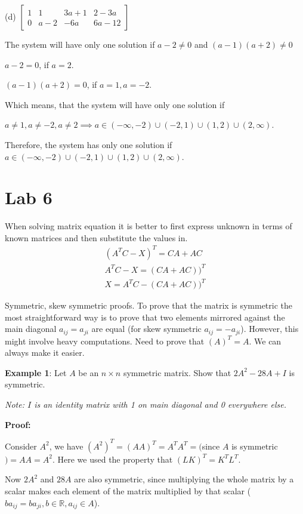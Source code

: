 \documentclass{article}
\begin{document}
\begin{enumerate}
(d) $\left[\begin{array}{ccc|c}1 & 1 & 3 a+1 & 2-3 a \\ 0 & a-2 & -6 a & 6 a-12\end{array}\right]$

The system will have only one solution if $a-2 \neq 0$ and $(a-1)(a+2) \neq 0$

$a-2=0$, if $a=2$.

$(a-1)(a+2)=0$, if $a=1, a=-2$.

Which means, that the system will have only one solution if 

$a \neq 1, a \neq-2, a \neq 2 \implies a \in(-\infty,-2) \cup(-2,1) \cup(1,2) \cup(2, \infty)$.

Therefore, the system has only one solution if $a \in(-\infty,-2) \cup(-2,1) \cup(1,2) \cup(2, \infty)$.

\end{enumerate}

\section{Lab 6}
When solving matrix equation it is better to first express unknown in terms of known matrices and then substitute the values in. 
\begin{align*}
\left(A^T C-X\right)^T=C A+A C\\
A^T C - X=\left(CA + AC\right))^T\\
X = A^T C - \left(CA + AC\right))^T
\end{align*}

Symmetric, skew symmetric proofs. 
To prove that the matrix is symmetric the most straightforward way is to prove that two elements mirrored against the main diagonal $a_{ij}=a_{ji}$  are equal (for skew symmetric $a_{ij}=-a_{ji}$).
However, this might involve heavy computations. Need to prove that $(A)^T=A$. We can always make it easier. 

\textbf{Example 1}: Let $A$ be an $n\times n$ symmetric matrix. Show that $2 A^2-28A+I$ is symmetric. 

\textit{Note: $I$ is an identity matrix with 1 on main diagonal and 0 everywhere else.}

\textbf{Proof:}

Consider $A^2$, we have $(A^2)^T=(AA)^T=A^TA^T=($since $A$ is symmetric $)=AA=A^2$. Here we used the property that $(LK)^T=K^TL^T$.

Now $2A^2$ and $28A$ are also symmetric, since multiplying the whole matrix by a scalar makes each element of the matrix multiplied by that scalar ($ba_{ij}=ba_{ji},b\in \mathbb{R},a_{ij}\in A$). 
\end{document}
